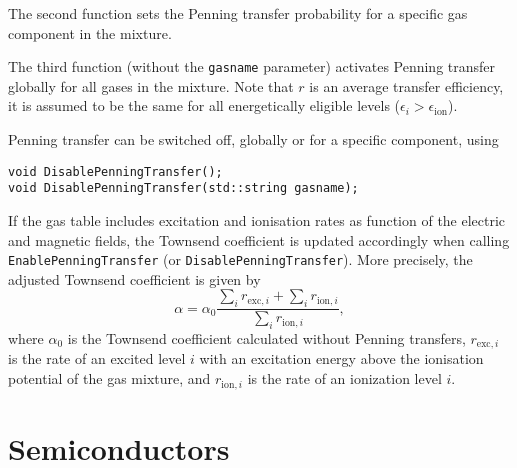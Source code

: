 The second function sets the Penning transfer probability for a 
specific gas component in the mixture.
 
The third function (without the \texttt{gasname} parameter)
activates Penning transfer globally for all gases in the mixture. 
Note that \(r\) is an average transfer efficiency, it is assumed to be the same 
for all energetically eligible levels (\(\epsilon_{i} > \epsilon_{\text{ion}}\)).

Penning transfer can be switched off, globally or for a specific component, 
using
\begin{lstlisting}
void DisablePenningTransfer();
void DisablePenningTransfer(std::string gasname);
\end{lstlisting}

If the gas table includes excitation and ionisation rates as function 
of the electric and magnetic fields, the Townsend coefficient is updated 
accordingly when calling \texttt{EnablePenningTransfer} 
(or \texttt{DisablePenningTransfer}). More precisely,  
the adjusted Townsend coefficient is given by
\begin{equation*}
  \alpha = \alpha_{0} \frac{\sum_{i} r_{\text{exc}, i} + \sum_{i} r_{\text{ion}, i}}{\sum_{i} r_{\text{ion}, i}},
\end{equation*}
where $\alpha_{0}$ is the Townsend coefficient calculated without Penning 
transfers,
$r_{\text{exc}, i}$ is the rate of an excited level $i$ with an excitation 
energy above the ionisation potential of the gas mixture, and 
$r_{\text{ion}, i}$ is the rate of an ionization level $i$.

\newpage
\section{Semiconductors}
